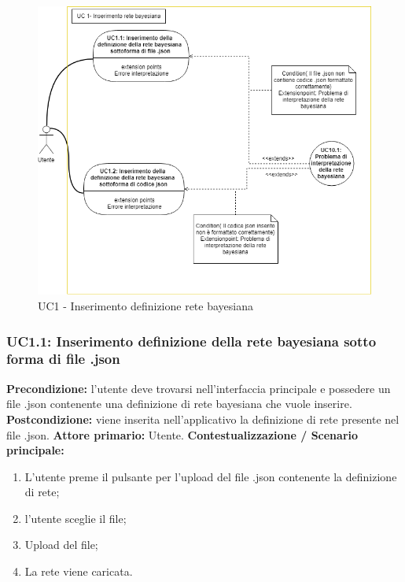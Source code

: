                 		\begin{figure}[!htbp]
		                	\centering
		                	\includegraphics[width=\textwidth]{UC1.png}
		                	\caption{UC1 - Inserimento definizione rete bayesiana}
			            \end{figure}
		            \clearpage
                        
                \subsubsection{UC1.1: Inserimento definizione della rete bayesiana sotto forma di file .json}
                    \textbf{Precondizione:}  l’utente deve trovarsi nell’interfaccia principale e possedere un file .json contenente una definizione di rete bayesiana che vuole inserire.
                    \newline
                    \textbf{Postcondizione:} viene inserita nell’applicativo la definizione di rete presente nel file .json.
                    \newline
                    \textbf{Attore primario:} Utente.
                    \newline
                    \textbf{Contestualizzazione / Scenario principale:} \begin{enumerate}
                        \item L’utente preme il pulsante per l’upload del file .json contenente la definizione di rete;
                        \item l’utente sceglie il file;
                        \item Upload del file;
                        \item La rete viene caricata.
                    \end{enumerate}
                    
